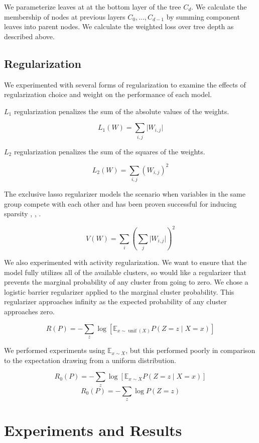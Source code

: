 \documentclass[11pt,letterpaper]{article}
\begin{document}
We parameterize leaves at at the bottom layer of the tree $C_d$. We calculate the membership of nodes at previous layers $C_0,...,C_{d-1}$ by summing component leaves into parent nodes. We calculate the weighted loss over tree depth as described above.

\subsection{Regularization}

We experimented with several forms of regularization to examine the effects of regularization choice and weight on the performance of each model.

$L_1$ regularization penalizes the sum of the absolute values of the weights.

$$L_1(W) = \sum_{i,j} \lvert W_{i,j} \rvert $$

$L_2$ regularization penalizes the sum of the squares of the weights.

$$L_2(W) = \sum_{i,j} (W_{i,j})^2 $$

The exclusive lasso regularizer models the scenario when variables in the same group compete with each other and has been proven successful for inducing sparsity
\cite{zhou10a}, 
\cite{bach2012},
 \cite{Campbell15}.

$$V(W) = \sum_i (\sum_j \lvert W_{i,j} \rvert)^2$$ 

We also experimented with activity regularization. We want to ensure that the model fully utilizes all of the available clusters, so would like a regularizer that prevents the marginal probability of any cluster from going to zero. We chose a logistic barrier regularizer applied to the marginal cluster probability. This regularizer approaches infinity as the expected probability of any cluster approaches zero.

$$ R(P) = -\sum_z \log[ \mathbb{E}_{x \sim \operatorname{unif}(X)} P(Z=z \mid X=x)]$$ 

We performed experiments using $\mathbb{E}_{x \sim X}$, but this performed poorly in comparison to the expectation drawing from a uniform distribution.

$$R_0(P) =  -\sum_z \log [ \mathbb{E}_{x \sim X} P(Z=z \mid X=x) ]$$ 
$$R_0(P) =  -\sum_z \log P(Z=z )$$ 

\section{Experiments and Results}
\end{document}
